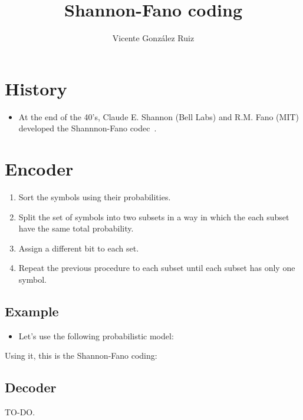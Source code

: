 
\title{Shannon-Fano coding}

\author{Vicente González Ruiz}

\maketitle

\section{History}

\begin{itemize}
\tightlist
\item
  At the end of the 40's, Claude E. Shannon (Bell Labs) and R.M. Fano
  (MIT) developed the Shannnon-Fano codec~\cite{fano1949transmission,
    shannon1948mathematical}.
\end{itemize}

\section{Encoder}
\begin{enumerate}
\tightlist
\item
  Sort the symbols using their probabilities.
\item
  Split the set of symbols into two subsets in a way in which the each
  subset have the same total probability.
\item
  Assign a different bit to each set.
\item
  Repeat the previous procedure to each subset until each subset has
  only one symbol.
\end{enumerate}

\subsection{Example}
\begin{itemize}
\tightlist
\item
  Let's use the following probabilistic model:
\end{itemize}


Using it, this is the Shannon-Fano coding:


\subsection{Decoder}
TO-DO.


